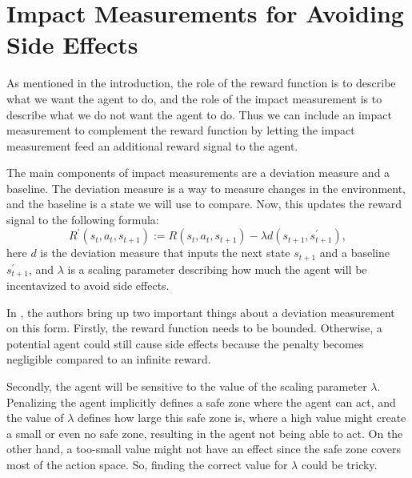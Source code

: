 \documentclass[12pt,A4]{report}
\newcommand{\autobaj}{}
\theoremstyle{definition}
\begin{document}
\section{Impact Measurements for Avoiding Side Effects}

As mentioned in the introduction, the role of the reward function is to describe what we want the agent to do, and the role of the impact measurement is to describe what we do not want the agent to do. Thus we can include an impact measurement to complement the reward function by letting the impact measurement feed an additional reward signal to the agent.

The main components of impact measurements are a deviation measure and a baseline. The deviation measure is a way to measure changes in the environment, and the baseline is a state we will use to compare. Now, this updates the reward signal to the following formula:
\[ R^\prime(s_t, a_t, s_{t+1}) := R(s_t, a_t, s_{t+1}) - \lambda d(s_{t+1
}, s_{t+1}^\prime), \]
here $d$ is the deviation measure that inputs the next state $s_{t+1}$ and a baseline $s_{t+1}^\prime$, and $\lambda$ is a scaling parameter describing how much the agent will be incentavized to avoid side effects.

In \citet{ArmstrongLevinstein}, the authors bring up two important things about a deviation measurement on this form. Firstly, the reward function needs to be bounded. Otherwise, a potential agent could still cause side effects because the penalty becomes negligible compared to an infinite reward. 

Secondly, the agent will be sensitive to the value of the scaling parameter $\lambda$. Penalizing the agent implicitly defines a safe zone where the agent can act, and the value of $\lambda$ defines how large this safe zone is, where a high value might create a small or even no safe zone, resulting in the agent not being able to act. On the other hand, a too-small value might not have an effect since the safe zone covers most of the action space. So, finding the correct value for $\lambda$ could be tricky. 


\end{document}
